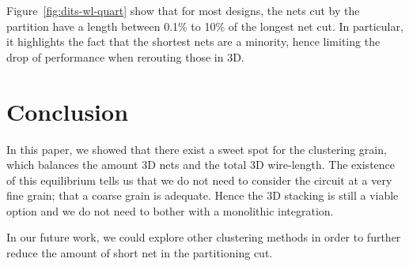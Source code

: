 \documentclass[conference]{IEEEtran}
\begin{document}
Figure~\ref{fig:dits-wl-quart} show that for most designs, the nets cut by the partition have a length between 0.1\% to 10\% of the longest net cut.
In particular, it highlights the fact that the shortest nets are a minority, hence limiting the drop of performance when rerouting those in 3D.



\section{Conclusion}
In this paper, we showed that there exist a sweet spot for the clustering grain, which balances the amount 3D nets and the total 3D wire-length.
The existence of this equilibrium tells us that we do not need to consider the circuit at a very fine grain; that a coarse grain is adequate.
Hence the 3D stacking is still a viable option and we do not need to bother with a monolithic integration.

In our future work, we could explore other clustering methods in order to further reduce the amount of short net in the partitioning cut.















%



\end{document}
